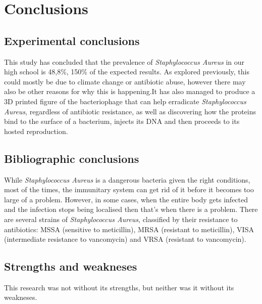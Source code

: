 \chapter{Conclusions}
\section{Experimental conclusions}
This study has concluded that the prevalence of \emph{Staphylococcus Aureus} in our high school is 48,8\%, 150\% of the expected results. As explored previously, this could mostly be due to climate change or antibiotic abuse, however there may also be other reasons for why this is happening.\newline It has also managed to produce a 3D printed figure of the bacteriophage that can help erradicate \emph{Staphylococcus Aureus}, regardless of antibiotic resistance, as well as discovering how the proteins bind to the surface of a bacterium, injects its DNA and then proceeds to its hosted reproduction.
\section{Bibliographic conclusions}
While \emph{Staphylococcus Aureus} is a dangerous bacteria given the right conditions, most of the times, the immunitary system can get rid of it before it becomes too large of a problem. However, in some cases, when the entire body gets infected and the infection stops being localised then that's when there is a problem. There are several strains of \emph{Staphylococcus Aureus}, classified by their resistance to antibiotics: MSSA (sensitive to meticillin), MRSA (resistant to meticillin), VISA (intermediate resistance to vancomycin) and VRSA (resistant to vancomycin).
\section{Strengths and weakneses}
This research was not without its strengths, but neither was it without its weakneses.

